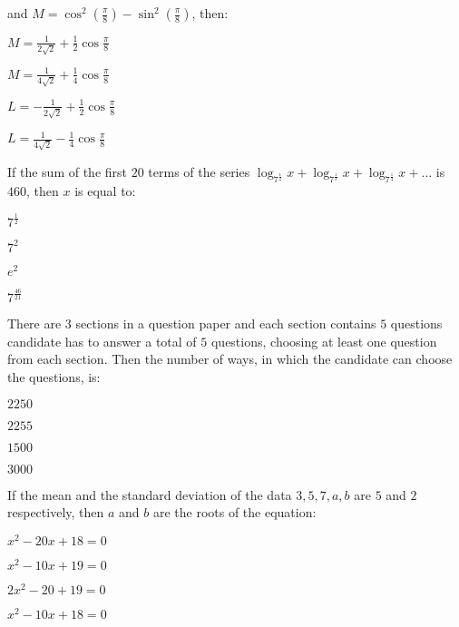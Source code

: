  and $M = \cos^2\left(\frac{\pi}{8}\right) - \sin^2\left(\frac{\pi}{8}\right)$, then:                 
 \begin{enumerate}  
 \end{enumerate}
 \item If the sum of the first $20$ terms of the series $\log_{{7}^{\frac{1}{2}}} x + \log_{{7}^{\frac{1}{3}}} x + \log_{{7}^{\frac{1}{4}}} x + \dots$ is $460$, then $x$ is equal to:
 \begin{enumerate}
 \begin{multicols}{4}
 \item ${7}^{\frac{1}{2}}$
 \item ${7}^{2}$
 \item ${e}^{2}$
\item ${7}^{\frac{46}{21}}$
 \end{multicols}
 \end{enumerate} 
 \item There are $3$ sections in a question paper and each section contains $5$ questions candidate has to answer a total of $5$ questions, choosing at least one question from each section. Then the number of ways, in which the candidate can choose the questions, is:
 \begin{enumerate}
 \begin{multicols}{4}
     \item $2250$
     \item $2255$
     \item $1500$
     \item $3000$
\end{multicols}
     \end{enumerate}
     \item If the mean and the standard deviation of the data $3,5,7,a,b$ are $5$ and $2$ respectively, then $a$ and $b$ are the roots of the equation:
     \begin{enumerate}
    \begin{multicols}{4}
\item $x^{2}-20x+18=0$
\item $x^{2}-10x+19=0$
\item $2x^{2}-20+19=0$
\item $x^{2}-10x+18=0$
     \end{multicols}
     \end{enumerate}
